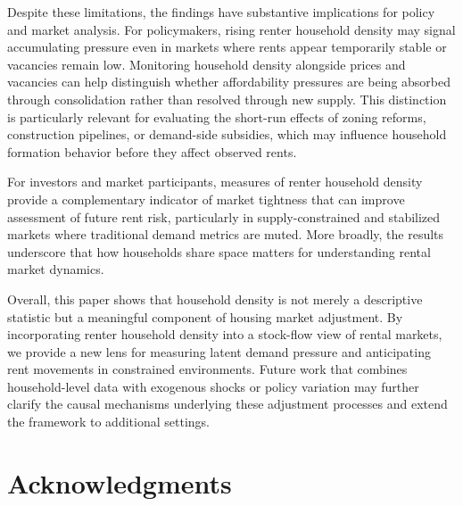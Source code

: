 \documentclass[pdflatex,sn-basic]{sn-jnl}%
\theoremstyle{thmstyleone}%
\theoremstyle{thmstyletwo}%
\theoremstyle{thmstylethree}%
\begin{document}
Despite these limitations, the findings have substantive implications for policy and
market analysis. For policymakers, rising renter household density may signal
accumulating pressure even in markets where rents appear temporarily stable or
vacancies remain low. Monitoring household density alongside prices and vacancies can
help distinguish whether affordability pressures are being absorbed through
consolidation rather than resolved through new supply. This distinction is particularly
relevant for evaluating the short-run effects of zoning reforms, construction pipelines,
or demand-side subsidies, which may influence household formation behavior before
they affect observed rents.

For investors and market participants, measures of renter household density provide a
complementary indicator of market tightness that can improve assessment of future rent
risk, particularly in supply-constrained and stabilized markets where traditional demand
metrics are muted. More broadly, the results underscore that how households share space
matters for understanding rental market dynamics.

Overall, this paper shows that household density is not merely a descriptive statistic
but a meaningful component of housing market adjustment. By incorporating renter
household density into a stock-flow view of rental markets, we provide a new lens for
measuring latent demand pressure and anticipating rent movements in constrained
environments. Future work that combines household-level data with exogenous shocks
or policy variation may further clarify the causal mechanisms underlying these
adjustment processes and extend the framework to additional settings.


\backmatter
\clearpage
\section*{Acknowledgments}
\end{document}
